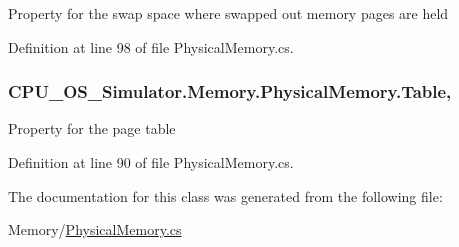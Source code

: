 Property for the swap space where swapped out memory pages are held 



Definition at line 98 of file Physical\+Memory.\+cs.

\hypertarget{class_c_p_u___o_s___simulator_1_1_memory_1_1_physical_memory_aaa669f8a92820bf792dd2ccb553254c9}{}
\subsubsection[{Table}]{ C\+P\+U\+\_\+\+O\+S\+\_\+\+Simulator.\+Memory.\+Physical\+Memory.\+Table\hspace{0.3cm}{\ttfamily [get]}, {\ttfamily [set]}}\label{class_c_p_u___o_s___simulator_1_1_memory_1_1_physical_memory_aaa669f8a92820bf792dd2ccb553254c9}


Property for the page table 



Definition at line 90 of file Physical\+Memory.\+cs.



The documentation for this class was generated from the following file\+:\begin{DoxyCompactItemize}
\item 
Memory/\hyperlink{_physical_memory_8cs}{Physical\+Memory.\+cs}\end{DoxyCompactItemize}
